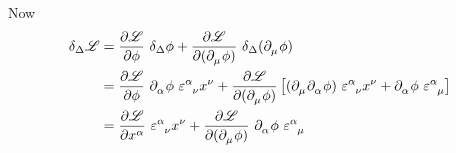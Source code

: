\documentclass{article}
\begin{document}
\noindent Now
\begin{align*}
    \delta_\Delta \mathscr{L} &= \dfrac{ \partial \mathscr{L} }{ \partial \phi } ~ \delta_\Delta \phi + \dfrac{ \partial \mathscr{L} }{ \partial ( \tensor{\partial}{_\mu} \phi ) } ~ \delta_\Delta ( \tensor{\partial}{_\mu} \phi ) \\
    &= \dfrac{ \partial \mathscr{L} }{ \partial \phi } ~ \tensor{\partial}{_\alpha} \phi ~ \tensor{\varepsilon}{^\alpha _\nu} \tensor{x}{^\nu} + \dfrac{ \partial \mathscr{L} }{ \partial ( \tensor{\partial}{_\mu} \phi ) } \left[ ( \tensor{\partial}{_\mu} \tensor{\partial}{_\alpha} \phi ) ~ \tensor{\varepsilon}{^\alpha _\nu} \tensor{x}{^\nu} + \tensor{\partial}{_\alpha} \phi ~ \tensor{\varepsilon}{^\alpha _\mu} \right] \\
    &= \dfrac{ \partial \mathscr{L} }{ \partial \tensor{x}{^\alpha} } ~ \tensor{\varepsilon}{^\alpha _\nu} \tensor{x}{^\nu} + \dfrac{ \partial \mathscr{L} }{ \partial ( \tensor{\partial}{_\mu} \phi ) } ~ \tensor{\partial}{_\alpha} \phi ~ \tensor{\varepsilon}{^\alpha _\mu}
\end{align*}

\end{document}
